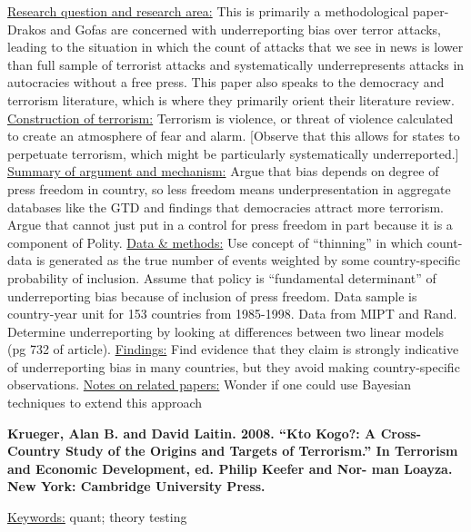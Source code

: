 \documentclass{article}[12pt]
\begin{document}
\underline{Research question and research area:} This is primarily a methodological paper- Drakos and Gofas are concerned with underreporting bias over terror attacks, leading to the situation in which the count of attacks that we see in news is lower than full sample of terrorist attacks and systematically underrepresents attacks in autocracies without a free press. This paper also speaks to the democracy and terrorism literature, which is where they primarily orient their literature review.
\underline{Construction of terrorism:} Terrorism is violence, or threat of violence calculated to create an atmosphere of fear and alarm. [Observe that this allows for states to perpetuate terrorism, which might be particularly systematically underreported.] 
\underline{Summary of argument and mechanism:} Argue that bias depends on degree of press freedom in country, so less freedom means underpresentation in aggregate databases like the GTD and findings that democracies attract more terrorism. Argue that cannot just put in a control for press freedom in part because it is a component of Polity.
\underline{Data \& methods:} Use concept of ``thinning'' in which count-data is generated as the true number of events weighted by some country-specific probability of inclusion. Assume that policy is ``fundamental determinant'' of underreporting bias because of inclusion of press freedom. Data sample is country-year unit for 153 countries from 1985-1998. Data from MIPT and Rand. Determine underreporting by looking at differences between two linear models (pg 732 of article).
\underline{Findings:} Find evidence that they claim is strongly indicative of underreporting bias in many countries, but they avoid making country-specific observations.
\underline{Notes on related papers:} Wonder if one could use Bayesian techniques to extend this approach


\textbf{Krueger, Alan B. and David Laitin. 2008. “Kto Kogo?: A Cross-Country Study of the Origins and Targets of Terrorism.” In Terrorism and Economic Development, ed. Philip Keefer and Nor- man Loayza. New York: Cambridge University Press.}

\underline{Keywords:} quant; theory testing
\end{document}
